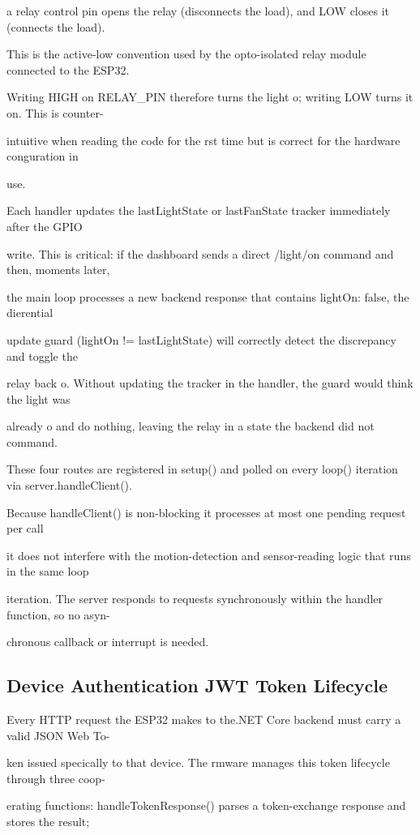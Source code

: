 a relay control pin opens the relay (disconnects the load), and LOW closes it (connects the load).

This is the active-low convention used by the opto-isolated relay module connected to the ESP32.

Writing HIGH on RELAY\_PIN therefore turns the light o; writing LOW turns it on. This is counter-

intuitive when reading the code for the rst time but is correct for the hardware conguration in

use.

Each handler updates the lastLightState or lastFanState tracker immediately after the GPIO

write. This is critical: if the dashboard sends a direct /light/on command and then, moments later,

the main loop processes a new backend response that contains lightOn: false, the dierential

update guard (lightOn != lastLightState) will correctly detect the discrepancy and toggle the

relay back o. Without updating the tracker in the handler, the guard would think the light was

already o and do nothing, leaving the relay in a state the backend did not command.

These four routes are registered in setup() and polled on every loop() iteration via server.handleClient().

Because handleClient() is non-blocking  it processes at most one pending request per call

it does not interfere with the motion-detection and sensor-reading logic that runs in the same loop

iteration. The server responds to requests synchronously within the handler function, so no asyn-

chronous callback or interrupt is needed.


\subsection{Device Authentication  JWT Token Lifecycle}
Every HTTP request the ESP32 makes to the.NET Core backend must carry a valid JSON Web To-

ken issued specically to that device. The rmware manages this token lifecycle through three coop-

erating functions: handleTokenResponse() parses a token-exchange response and stores the result;

